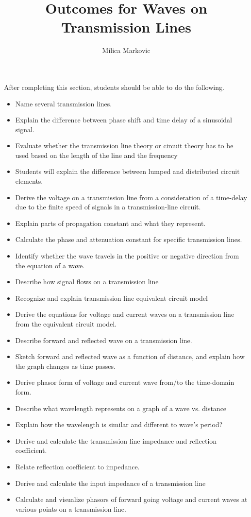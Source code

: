 \documentclass{ximera}
\title{Outcomes for Waves on Transmission Lines}
\author{Milica Markovic}
\begin{document}
\begin{abstract}
\end{abstract}

\maketitle

\begin{sectionOutcomes}

After completing this section, students should be able to do the following.

\begin{itemize}
\item Name several transmission lines.
\item Explain the difference between phase shift and time delay of a sinusoidal signal.
\item Evaluate whether the transmission line theory or circuit theory has to be used based on the length of the line and the frequency
\item Students will explain the difference between lumped and distributed circuit elements.
\item Derive the voltage on a transmission line from a consideration of a time-delay due to the finite speed of signals in a transmission-line circuit.
\item Explain parts of propagation constant and what they represent.
\item Calculate the phase and attenuation constant for specific transmission lines.
\item Identify whether the wave travels in the positive or negative direction from the equation of a wave.
\item Describe how signal flows on a transmission line
\item Recognize and explain transmission line equivalent circuit model
\item Derive the equations for voltage and current waves on a transmission line from the equivalent circuit model.
\item Describe forward and reflected wave on a transmission line.
\item Sketch forward and reflected wave as a function of distance, and explain how the graph changes as time passes.
\item Derive phasor form of voltage and current wave from/to the time-domain form.
\item Describe what wavelength represents on a graph of a wave vs. distance
\item Explain how the wavelength is similar and different to wave’s period?
\item Derive and calculate the transmission line impedance and reflection coefficient.
\item Relate reflection coefficient to impedance.
\item Derive and calculate the input impedance of a transmission line
\item Calculate and visualize phasors of forward going voltage and current waves at various points on a transmission line.
\end{itemize}

\end{sectionOutcomes}
\end{document}
